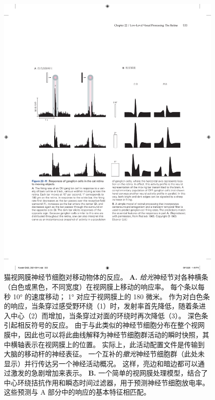 \begin{figure}[htbp]
	\centering
	\includegraphics[width=1.0\linewidth]{chap22/fig_22_11}
	\caption{猫视网膜神经节细胞对移动物体的反应。 
		\textbf{A.} \textit{给光}神经节对各种横条（白色或黑色，不同宽度）在视网膜上移动的响应率。 
		每个条以每秒 10° 的速度移动； 1° 对应于视网膜上的 180 微米。
		作为对白色条的响应，当条穿过感受野环绕（1）时，发射率首先降低，随着条进入中心（2）而增加，当条穿过对面的环绕时再次降低（3）。
		深色条引起相反符号的反应。 
		由于与此类似的神经节细胞分布在整个视网膜中，因此也可以将此曲线解释为神经节细胞群活动的瞬时快照，其中横轴表示在视网膜上的位置。 
		实际上，此活动配置文件是传输到大脑的移动杆的神经表征。 
		一个互补的\textit{撤光}神经节细胞群（此处未显示）并行传达另一个神经活动概况。 这样，亮边和暗边都可以通过激发的急剧增加来表示。 
		\textbf{B.} 一个简单的视网膜处理模型，结合了中心环绕拮抗作用和瞬态时间过滤器，用于预测神经节细胞放电率。 
		这些预测与 A 部分中的响应的基本特征相匹配。}
	\label{fig:22_11}
\end{figure}


